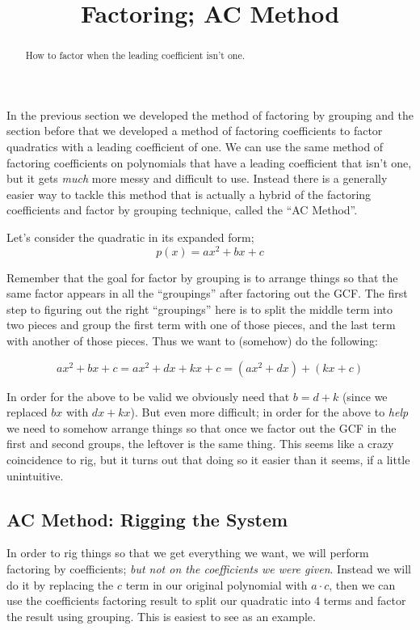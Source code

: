 \documentclass{ximera}
\title{Factoring; AC Method}
\begin{document}
\begin{abstract}
    How to factor when the leading coefficient isn't one.
\end{abstract}
\maketitle


In the previous section we developed the method of factoring by grouping and the section before that we developed a method of factoring coefficients to factor quadratics with a leading coefficient of one. We can use the same method of factoring coefficients on polynomials that have a leading coefficient that isn't one, but it gets \textit{much} more messy and difficult to use. Instead there is a generally easier way to tackle this method that is actually a hybrid of the factoring coefficients and factor by grouping technique, called the ``AC Method''.


Let's consider the quadratic in its expanded form;
\[
    p(x) = ax^2 + bx + c
\]

Remember that the goal for factor by grouping is to arrange things so that the same factor appears in all the ``groupings'' after factoring out the GCF. The first step to figuring out the right ``groupings'' here is to split the middle term into two pieces and group the first term with one of those pieces, and the last term with another of those pieces. Thus we want to (somehow) do the following:

\[
    ax^2 + bx + c = ax^2 + dx + kx + c = (ax^2 + dx) + (kx + c)
\]

In order for the above to be valid we obviously need that $b = d + k$ (since we replaced $bx$ with $dx + kx$). But even more difficult; in order for the above to \textit{help} we need to somehow arrange things so that once we factor out the GCF in the first and second groups, the leftover is the same thing. This seems like a crazy coincidence to rig, but it turns out that doing so it easier than it seems, if a little unintuitive.

\subsection*{AC Method: Rigging the System} 

In order to rig things so that we get everything we want, we will perform factoring by coefficients; \emph{but not on the coefficients we were given}. Instead we will do it by replacing the $c$ term in our original polynomial with $a \cdot c$, then we can use the coefficients factoring result to split our quadratic into 4 terms and factor the result using grouping. This is easiest to see as an example.
\end{document}
